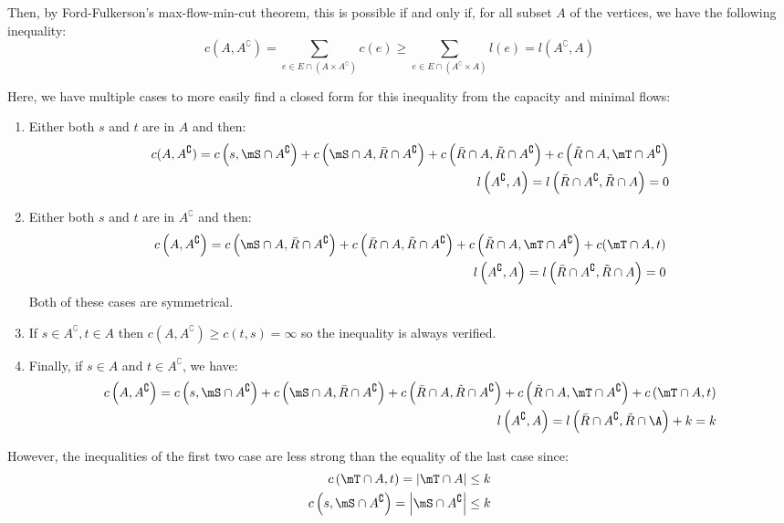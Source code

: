 \documentclass[math]{cours}
\def\bR{\bar{R}}
\def\tR{\tilde{R}}
\def\Ac{A^{\complement}}
\begin{document}
Then, by Ford-Fulkerson's max-flow-min-cut theorem, this is possible if and only if, for all subset $A$ of the vertices, we have the following inequality:
\begin{equation}
	c(A, \Ac) = \sum_{e \in E \cap \left(A\times \Ac\right)} c(e) \geq
	\sum_{e \in E \cap \left(\Ac\times A \right)}l(e) = l(\Ac, A)
	\label{eqfordfulkerson}
\end{equation}

Here, we have multiple cases to more easily find a closed form for this inequality from the capacity and minimal flows:
\begin{enumerate}
	\item Either both $s$ and $t$ are in $A$ and then:
		\begin{align*}
			c(A, \Ac) = c\left(s, \mS\cap \Ac \right) + c\left(\mS\cap A, \bR\cap \Ac\right) + c\left(\bR\cap A, \tR \cap \Ac \right) + c\left(\tR\cap A, \mT \cap \Ac\right)\\
			l\left( \Ac, A \right) = l\left(\bR\cap \Ac, \tR\cap A \right) = 0
		\end{align*}
	\item Either both $s$ and $t$ are in $\Ac$ and then:
		\begin{align*}
			c\left(A, \Ac\right) = c\left(\mS \cap A,  \bR \cap \Ac\right) + c\left(\bR \cap A, \tR\cap \Ac \right) + c\left(\tR\cap A, \mT \cap \Ac \right) + c(\mT\cap A, t)\\
			l\left(\Ac, A \right) = l\left(\bR \cap \Ac, \tR\cap A \right) = 0
		\end{align*}
		Both of these cases are symmetrical.
	\item If $s \in \Ac, t\in A$ then $c(A, \Ac) \geq c(t, s) = \infty$ so the inequality is always verified.
	\item Finally, if $s \in A$ and $t \in \Ac$, we have:
		\begin{align*}
			c\left(A, \Ac \right) = c\left(s, \mS \cap \Ac \right) + c\left(\mS \cap A, \bR \cap \Ac \right) + c\left(\bR \cap A, \tR \cap \Ac \right) + c\left(\tR\cap A, \mT \cap \Ac\right) + c\left(\mT\cap A, t \right)\\
			l\left(\Ac, A \right) = l\left( \bR\cap \Ac, \tR\cap \A \right) + k = k
		\end{align*}
\end{enumerate}
However, the inequalities of the first two case are less strong than the equality of the last case since:
\begin{align*}
	c\left(\mT\cap A, t \right) = \abs{\mT \cap A} \leq k\\
	c\left(s, \mS\cap \Ac \right) = \abs{\mS\cap \Ac} \leq k
\end{align*}
\end{document}
